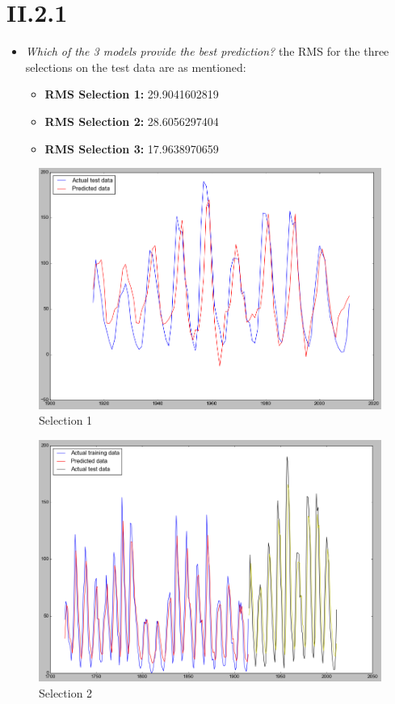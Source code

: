 \documentclass[12pt, a4paper]{article}
\begin{document}
\section{II.2.1}
\begin{itemize}
\item \textit{Which of the 3 models provide the best prediction?} 
the RMS for the three selections on the test data are as mentioned:
		\begin{itemize}
		\item \textbf{RMS Selection 1:} 29.9041602819
		\item \textbf{RMS Selection 2:} 28.6056297404
		\item \textbf{RMS Selection 3:} 17.9638970659
	\end{itemize}
\end{itemize}

\begin{figure}[H]
	\includegraphics[scale=0.5]{ml_selection_1.png}
	\caption{Selection 1}
\end{figure}

\begin{figure}[H]
	\includegraphics[scale=0.5]{ml_selection_2.png}
	\caption{Selection 2}
\end{figure}
\end{document}
